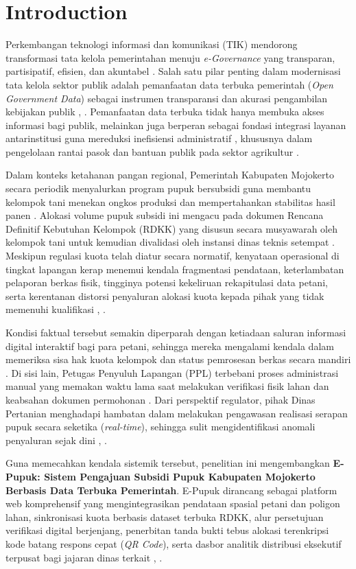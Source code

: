 \documentclass[conference]{IEEEtran}
\begin{document}
\section{Introduction}  
Perkembangan teknologi informasi dan komunikasi (TIK) mendorong transformasi tata kelola pemerintahan menuju \textit{e-Governance} yang transparan, partisipatif, efisien, dan akuntabel \cite{b1}. Salah satu pilar penting dalam modernisasi tata kelola sektor publik adalah pemanfaatan data terbuka pemerintah (\textit{Open Government Data}) sebagai instrumen transparansi dan akurasi pengambilan kebijakan publik \cite{b2}, \cite{b3}. Pemanfaatan data terbuka tidak hanya membuka akses informasi bagi publik, melainkan juga berperan sebagai fondasi integrasi layanan antarinstitusi guna mereduksi inefisiensi administratif \cite{b3}, khususnya dalam pengelolaan rantai pasok dan bantuan publik pada sektor agrikultur \cite{b6}.

Dalam konteks ketahanan pangan regional, Pemerintah Kabupaten Mojokerto secara periodik menyalurkan program pupuk bersubsidi guna membantu kelompok tani menekan ongkos produksi dan mempertahankan stabilitas hasil panen \cite{b5}. Alokasi volume pupuk subsidi ini mengacu pada dokumen Rencana Definitif Kebutuhan Kelompok (RDKK) yang disusun secara musyawarah oleh kelompok tani untuk kemudian divalidasi oleh instansi dinas teknis setempat \cite{b4}. Meskipun regulasi kuota telah diatur secara normatif, kenyataan operasional di tingkat lapangan kerap menemui kendala fragmentasi pendataan, keterlambatan pelaporan berkas fisik, tingginya potensi kekeliruan rekapitulasi data petani, serta kerentanan distorsi penyaluran alokasi kuota kepada pihak yang tidak memenuhi kualifikasi \cite{b5}, \cite{b7}.

Kondisi faktual tersebut semakin diperparah dengan ketiadaan saluran informasi digital interaktif bagi para petani, sehingga mereka mengalami kendala dalam memeriksa sisa hak kuota kelompok dan status pemrosesan berkas secara mandiri \cite{b7}. Di sisi lain, Petugas Penyuluh Lapangan (PPL) terbebani proses administrasi manual yang memakan waktu lama saat melakukan verifikasi fisik lahan dan keabsahan dokumen permohonan \cite{b6}. Dari perspektif regulator, pihak Dinas Pertanian menghadapi hambatan dalam melakukan pengawasan realisasi serapan pupuk secara seketika (\textit{real-time}), sehingga sulit mengidentifikasi anomali penyaluran sejak dini \cite{b3}, \cite{b5}.

Guna memecahkan kendala sistemik tersebut, penelitian ini mengembangkan \textbf{E-Pupuk: Sistem Pengajuan Subsidi Pupuk Kabupaten Mojokerto Berbasis Data Terbuka Pemerintah}. E-Pupuk dirancang sebagai platform web komprehensif yang mengintegrasikan pendataan spasial petani dan poligon lahan, sinkronisasi kuota berbasis dataset terbuka RDKK, alur persetujuan verifikasi digital berjenjang, penerbitan tanda bukti tebus alokasi terenkripsi kode batang respons cepat (\textit{QR Code}), serta dasbor analitik distribusi eksekutif terpusat bagi jajaran dinas terkait \cite{b6}, \cite{b7}.
\end{document}

